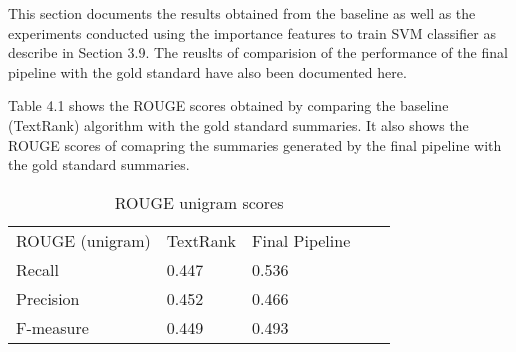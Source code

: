 This section documents the results obtained from the baseline as well as the experiments conducted using the importance features to train SVM classifier as describe in Section 3.9.
The reuslts of comparision of the performance of the final pipeline with the gold standard have also been documented here.

Table 4.1 shows the ROUGE scores obtained by comparing the baseline (TextRank) algorithm with the gold standard summaries.
It also shows the ROUGE scores of comapring the summaries generated by the final pipeline with the gold standard summaries.

\begin{table}[h]
\centering
\caption{ROUGE unigram scores}
\begin{tabular}{|l|l|l|ll}
\cline{1-3}
ROUGE (unigram) & TextRank & Final Pipeline &  &  \\ \cline{1-3}
Recall          & 0.447    & 0.536          &  &  \\ \cline{1-3}
Precision       & 0.452    & 0.466          &  &  \\ \cline{1-3}
F-measure       & 0.449    & 0.493          &  &  \\ \cline{1-3}
\end{tabular}
\end{table}

